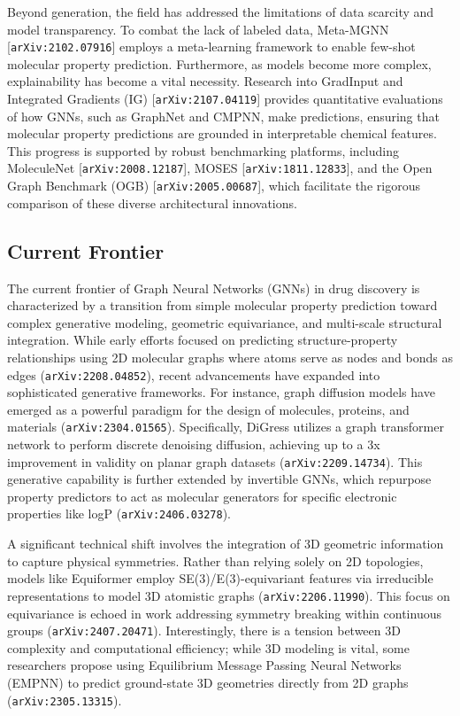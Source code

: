 \documentclass[11pt]{article}
\begin{document}
Beyond generation, the field has addressed the limitations of data scarcity and model transparency. To combat the lack of labeled data, Meta-MGNN [\texttt{arXiv:2102.07916}] employs a meta-learning framework to enable few-shot molecular property prediction. Furthermore, as models become more complex, explainability has become a vital necessity. Research into GradInput and Integrated Gradients (IG) [\texttt{arXiv:2107.04119}] provides quantitative evaluations of how GNNs, such as GraphNet and CMPNN, make predictions, ensuring that molecular property predictions are grounded in interpretable chemical features. This progress is supported by robust benchmarking platforms, including MoleculeNet [\texttt{arXiv:2008.12187}], MOSES [\texttt{arXiv:1811.12833}], and the Open Graph Benchmark (OGB) [\texttt{arXiv:2005.00687}], which facilitate the rigorous comparison of these diverse architectural innovations.

\subsection{Current Frontier}

The current frontier of Graph Neural Networks (GNNs) in drug discovery is characterized by a transition from simple molecular property prediction toward complex generative modeling, geometric equivariance, and multi-scale structural integration. While early efforts focused on predicting structure-property relationships using 2D molecular graphs where atoms serve as nodes and bonds as edges (\texttt{arXiv:2208.04852}), recent advancements have expanded into sophisticated generative frameworks. For instance, graph diffusion models have emerged as a powerful paradigm for the design of molecules, proteins, and materials (\texttt{arXiv:2304.01565}). Specifically, DiGress utilizes a graph transformer network to perform discrete denoising diffusion, achieving up to a 3x improvement in validity on planar graph datasets (\texttt{arXiv:2209.14734}). This generative capability is further extended by invertible GNNs, which repurpose property predictors to act as molecular generators for specific electronic properties like logP (\texttt{arXiv:2406.03278}).

A significant technical shift involves the integration of 3D geometric information to capture physical symmetries. Rather than relying solely on 2D topologies, models like Equiformer employ SE(3)/E(3)-equivariant features via irreducible representations to model 3D atomistic graphs (\texttt{arXiv:2206.11990}). This focus on equivariance is echoed in work addressing symmetry breaking within continuous groups (\texttt{arXiv:2407.20471}). Interestingly, there is a tension between 3D complexity and computational efficiency; while 3D modeling is vital, some researchers propose using Equilibrium Message Passing Neural Networks (EMPNN) to predict ground-state 3D geometries directly from 2D graphs (\texttt{arXiv:2305.13315}).
\end{document}
